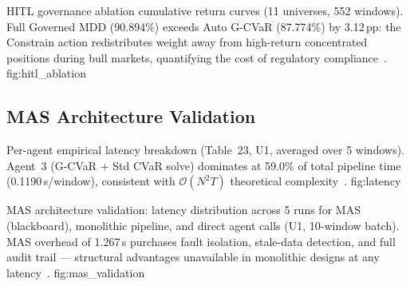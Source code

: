   {HITL governance ablation cumulative return curves (11 universes,
   552 windows). Full Governed MDD (90.894\%) exceeds Auto G-CVaR
   (87.774\%) by 3.12\,pp: the Constrain action redistributes
   weight away from high-return concentrated positions during bull
   markets, quantifying the cost of regulatory compliance~\citep{nystrup2019}.}
  {fig:hitl_ablation}

\subsection{MAS Architecture Validation}

\begin{table}[H]
\centering
\caption{MAS vs monolithic architecture (Table~28, U1, 10 windows,
         5 runs). The 1.267-second overhead per 10-window batch
         purchases complete audit trail and fault isolation~\citep{hayesroth1985,wooldridge2009}.}
\label{tab:mas}
\end{table}

  {Per-agent empirical latency breakdown (Table~23, U1, averaged
   over 5 windows). Agent~3 (G-CVaR + Std CVaR solve) dominates
   at 59.0\% of total pipeline time (0.1190\,s/window), consistent
   with $\mathcal{O}(N^2 T)$ theoretical complexity~\citep{rockafellar2000,diamond2016}.}
  {fig:latency}

  {MAS architecture validation: latency distribution across 5 runs
   for MAS (blackboard), monolithic pipeline, and direct agent calls
   (U1, 10-window batch). MAS overhead of 1.267\,s purchases fault
   isolation, stale-data detection, and full audit trail — structural
   advantages unavailable in monolithic designs at any
   latency~\citep{hayesroth1985,erman1980,mifid2014}.}
  {fig:mas_validation}

